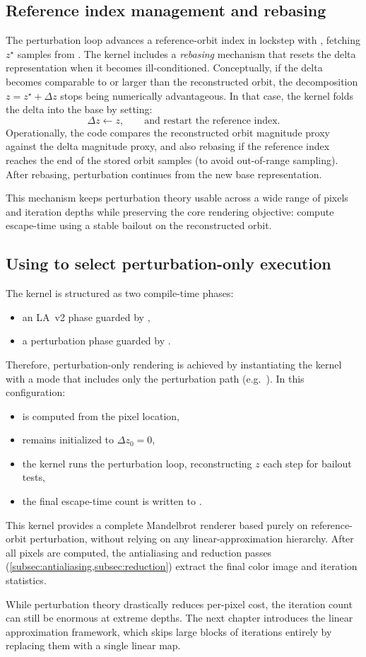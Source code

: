 \subsection{Reference index management and rebasing}
\label{sec:perturb-only-rebase}

The perturbation loop advances a reference-orbit index  in
lockstep with , fetching \(z^\star\) samples from . The
kernel includes a \emph{rebasing} mechanism that resets the delta
representation when it becomes ill-conditioned. Conceptually, if the delta
becomes comparable to or larger than the reconstructed orbit, the decomposition
\(z = z^\star + \Delta z\) stops being numerically advantageous. In that case,
the kernel folds the delta into the base by setting:
\[
\Delta z \leftarrow z,\qquad \text{and restart the reference index.}
\]
Operationally, the code compares the reconstructed orbit magnitude proxy
against the delta magnitude proxy, and also rebasing if the reference index
reaches the end of the stored orbit samples (to avoid out-of-range sampling).
After rebasing, perturbation continues from the new base representation.

This mechanism keeps perturbation theory usable across a wide range of
pixels and iteration depths while preserving the core rendering objective:
compute escape-time using a stable bailout on the reconstructed orbit.

\subsection{Using  to select perturbation-only execution}
\label{sec:perturb-only-mode}

The kernel is structured as two compile-time phases:
\begin{itemize}
\item an LA~v2 phase guarded by ,
\item a perturbation phase guarded by .
\end{itemize}
Therefore, perturbation-only rendering is achieved by instantiating the kernel
with a mode that includes only the perturbation path (e.g.\ ).
In this configuration:
\begin{itemize}
\item {} is computed from the pixel location,
\item {} remains initialized to \(\Delta z_0 = 0\),
\item the kernel runs the perturbation loop, reconstructing \(z\) each step for
      bailout tests,
\item the final escape-time count is written to .
\end{itemize}
This kernel provides a complete Mandelbrot renderer based purely on reference-orbit
perturbation, without relying on any linear-approximation hierarchy.
After all pixels are computed, the antialiasing and reduction passes
(\cref{subsec:antialiasing,subsec:reduction}) extract the final color
image and iteration statistics.

While perturbation theory drastically reduces per-pixel cost, the iteration
count can still be enormous at extreme depths.  The next chapter introduces
the linear approximation framework, which skips large blocks of iterations
entirely by replacing them with a single linear map.
